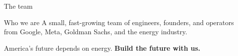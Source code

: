 
\begin{frame}{The team}
  \begin{block}{Who we are}
    A small, fast-growing team of engineers, founders, and operators from
    Google, Meta, Goldman Sachs, and the energy industry.
  \end{block}

  \vspace{0.8em}
  America's future depends on energy. \textbf{Build the future with us.}
\end{frame}
